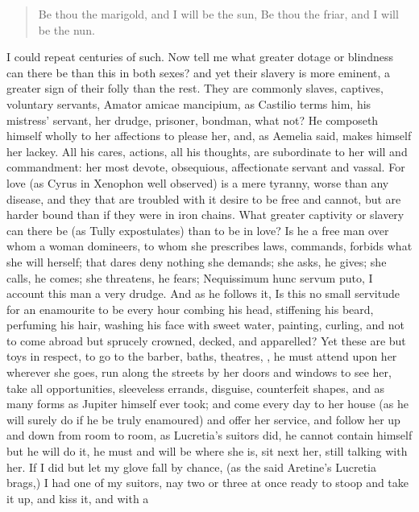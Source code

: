 \begin{verse}%
Be thou the marigold, and I will be the sun,
Be thou the friar, and I will be the nun.
\end{verse}%

I could repeat centuries of such. Now tell me what greater dotage or
blindness can there be than this in both sexes? and yet their slavery
is more eminent, a greater sign of their folly than the rest.
They are commonly slaves, captives, voluntary servants, Amator amicae
mancipium, as Castilio terms him, his mistress' servant, her
drudge, prisoner, bondman, what not? He composeth himself wholly to her
affections to please her, and, as Aemelia said, makes himself her
lackey. All his cares, actions, all his thoughts, are subordinate to
her will and commandment: her most devote, obsequious, affectionate
servant and vassal. For love (as Cyrus in Xenophon well observed)
is a mere tyranny, worse than any disease, and they that are troubled
with it desire to be free and cannot, but are harder bound than if they
were in iron chains. What greater captivity or slavery can there be (as
Tully expostulates) than to be in love? Is he a free man over
whom a woman domineers, to whom she prescribes laws, commands, forbids
what she will herself; that dares deny nothing she demands; she asks,
he gives; she calls, he comes; she threatens, he fears; Nequissimum
hunc servum puto, I account this man a very drudge. And as he follows
it, Is this no small servitude for an enamourite to be every hour
combing his head, stiffening his beard, perfuming his hair, washing his
face with sweet water, painting, curling, and not to come abroad but
sprucely crowned, decked, and apparelled? Yet these are but toys in
respect, to go to the barber, baths, theatres, \etc{}, he must attend upon
her wherever she goes, run along the streets by her doors and windows
to see her, take all opportunities, sleeveless errands, disguise,
counterfeit shapes, and as many forms as Jupiter himself ever took; and
come every day to her house (as he will surely do if he be truly
enamoured) and offer her service, and follow her up and down from room
to room, as Lucretia's suitors did, he cannot contain himself but he
will do it, he must and will be where she is, sit next her, still
talking with her. If I did but let my glove fall by chance, (as
the said Aretine's Lucretia brags,) I had one of my suitors, nay two or
three at once ready to stoop and take it up, and kiss it, and with a
